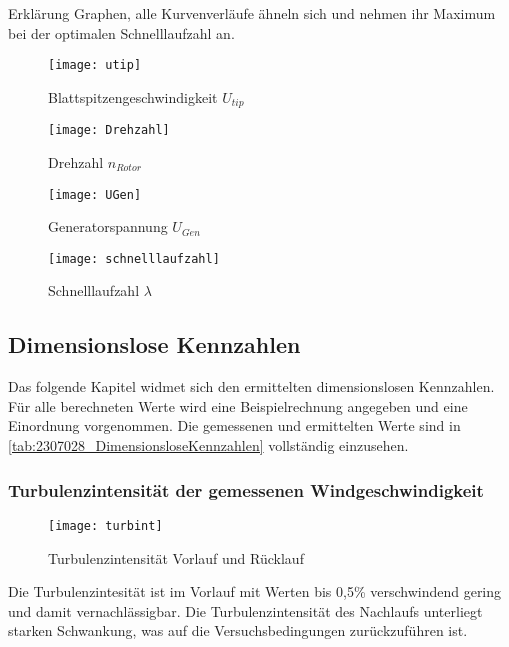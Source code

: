 Erklärung Graphen, alle Kurvenverläufe ähneln sich und nehmen ihr Maximum bei der optimalen Schnelllaufzahl an.
\begin{figure}[H]
    \centering
        \begin{minipage}[t]{0.4\textwidth}
            \texttt{[image: utip]}
            \caption{Blattspitzengeschwindigkeit $U_{tip}$}
            \label{fig:utip}
        \end{minipage}
        \begin{minipage}[t]{0.4\textwidth}
            \texttt{[image: Drehzahl]}
            \caption{Drehzahl $n_{Rotor}$}
            \label{fig:n_rotor}
        \end{minipage}
        \begin{minipage}[b]{0.4\textwidth}
            \texttt{[image: UGen]}
            \caption{Generatorspannung $U_{Gen}$}
            \label{fig:UGen}
        \end{minipage}
        \begin{minipage}[b]{0.4\textwidth}
            \texttt{[image: schnelllaufzahl]}
            \caption{Schnelllaufzahl $\lambda$}
            \label{fig:lambda}
        \end{minipage}
    \end{figure}  

\subsection{Dimensionslose Kennzahlen}
Das folgende Kapitel widmet sich den ermittelten dimensionslosen Kennzahlen.
Für alle berechneten Werte wird eine Beispielrechnung angegeben und eine Einordnung vorgenommen.
Die gemessenen und ermittelten Werte sind in \autoref{tab:2307028_DimensionsloseKennzahlen} vollständig einzusehen.
\subsubsection*{Turbulenzintensität der gemessenen Windgeschwindigkeit}
\begin{figure}[H]
    \centering
    \texttt{[image: turbint]}
    \caption{Turbulenzintensität Vorlauf und Rücklauf}
    \label{fig:Turbulenzintensität}
\end{figure}
Die Turbulenzintesität ist im Vorlauf mit Werten bis 0,5\% verschwindend gering und damit vernachlässigbar. Die Turbulenzintensität des Nachlaufs unterliegt starken Schwankung, was auf die Versuchsbedingungen zurückzuführen ist.

